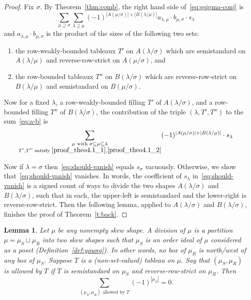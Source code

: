 \documentclass[11pt]{article}
\newtheorem{lemma}[theorem]{Lemma}
\theoremstyle{definition}
\begin{document}
\begin{proof}
Fix $\sigma$. By Theorem~\ref{thm:comb}, the right hand side of~\eqref{eq:gsigma-conj} is
\begin{equation}\label{eq:a-b}
\sum_{\mu\supseteq \sigma} \sum_{\lambda\supseteq \mu} (-1)^{|A(\mu/\sigma)|+|B(\lambda/\mu)|} a_{\lambda,\mu} \cdot b_{\mu,\sigma} \cdot s_\lambda
\end{equation}
and $a_{\lambda,\mu} \cdot b_{\mu,\sigma}$ is the product of the sizes of the following two sets:
\begin{enumerate}
\item\label{proof_theo4.1_1} the row-weakly-bounded tableaux $T'$ on $A(\lambda/\sigma)$ which are semistandard on $A(\lambda/\mu)$ and reverse-row-strict on $A(\mu/\sigma)$, and
\item\label{proof_theo4.1_2} the row-bounded tableaux $T''$ on $B(\lambda/\sigma)$ which are reverse-row-strict on $B(\lambda/\mu)$ and semistandard on $B(\mu/\sigma)$.
\end{enumerate} 

Now for a fixed $\lambda$, a row-weakly-bounded filling $T'$ of $A(\lambda/\sigma)$, and a row-bounded filling $T''$ of $B(\lambda/\sigma)$, the contribution of the triple $(\lambda,T',T'')$ to the sum~\eqref{eq:a-b} is
\begin{equation}\label{eq:should-vanish}
\sum_{\substack{\mu\text{ with } \sigma\subseteq \mu\subseteq \lambda \\T',T''\text{ satisfy }\eqref{proof_theo4.1_1},\eqref{proof_theo4.1_2}}}
 (-1)^{|A(\mu/\sigma)|+|B(\lambda/\mu)|}\cdot s_\lambda
 \end{equation}

Now if $\lambda = \sigma$ then~\eqref{eq:should-vanish} equals $s_\sigma$ vacuously. Otherwise, we show that~\eqref{eq:should-vanish} vanishes. In words, the coefficient of $s_\lambda$ in~\eqref{eq:should-vanish} is a signed count of ways to divide the two shapes $A(\lambda/\sigma)$ and $B(\lambda/\sigma)$, such that in each, the upper-left is semistandard and the lower-right is reverse-row-strict. Then the following lemma, applied to $A(\lambda/\sigma)$ and $B(\lambda/\sigma)$, finishes the proof of Theorem~\ref{t:back}. 
\end{proof}

\begin{lemma}\label{lem:ss-rrs}
Let $\mu$ be any nonempty skew shape. A \emph{division} of $\mu$ is a partition $\mu = \mu_S \sqcup \mu_R$ into two skew shapes such that $\mu_S$ is an order ideal of $\mu$ considered as a poset (Definition~\ref{def:young}). In other words, no box of $\mu_R$ is north/west of any box of $\mu_S$.
Suppose $T$ is a (non-set-valued) tableau on $\mu$. Say that $(\mu_S,\mu_R)$ is \emph{allowed} by $T$ if $T$ is semistandard on $\mu_S$ and reverse-row-strict on $\mu_R$. Then
\[
\sum_{(\mu_S,\mu_R) \text{ allowed by }T} (-1)^{|\mu_S|} = 0.
\]
\end{lemma}
\end{document}
